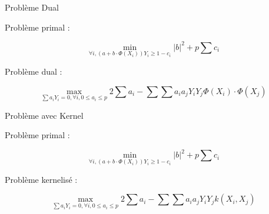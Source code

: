 \documentclass[11pt]{beamer}
\begin{document}
\begin{frame}{Problème Dual}

Problème primal :

$$\min_{\forall i, (a+b\cdot \Phi(X_i))Y_i \geq 1-c_i} |b|^2+p\sum c_i$$

Problème dual  :

$$\max_{\sum a_iY_i=0,\forall i, 0\leq a_i \leq p} 2\sum a_i-\sum\sum a_ia_jY_iY_j\Phi(X_i)\cdot\Phi(X_j)$$


\end{frame}

\begin{frame}{Problème avec Kernel}

Problème primal :

$$\min_{\forall i, (a+b\cdot \Phi(X_i))Y_i \geq 1-c_i} |b|^2+p\sum c_i$$

Problème kernelisé  :

$$\max_{\sum a_iY_i=0,\forall i, 0\leq a_i \leq p} 2\sum a_i-\sum\sum a_ia_jY_iY_jk(X_i,X_j)$$


\end{frame}
\end{document}
